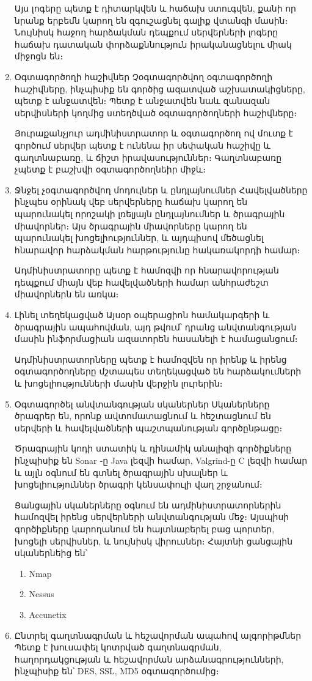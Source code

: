 \documentclass[11pt]{article}
\begin{document}
\begin{sloppypar}
\begin{enumerate}
    Այս լոգերը պետք է դիտարկվեն և հաճախ ստուգվեն, քանի որ նրանք երբեմն
    կարող են զգուշացնել գալիք վտանգի մասին։ Նույնիսկ հաջող հարձակման
    դեպքում սերվերների լոգերը հաճախ դատական փորձաքննություն
    իրականացնելու միակ միջոցն են։
\item Օգտագործողի հաշիվներ
    Չօգտագործվող օգտագործողի հաշիվները, ինչպիսիք են գործից ազատված
    աշխատակիցները, պետք է անջատվեն։ Պետք է անջատվեն նաև զանազան
    սերվիսների կողմից ստեղծված օգտագործողների հաշիվները։

    Յուրաքանչյուր ադմինիստրատոր և օգտագործող ով մուտք է գործում
    սերվեր պետք է ունենա իր սեփական հաշիվը և գաղտնաբառը, և ճիշտ
    իրավասություններ։ Գաղտնաբառը չպետք է բաշխվի օգտագործողնեիր միջև։
\item Ջնջել չօգտագործվող մոդուլներ և ընդլայնումներ
    Հավելվածները ինչպես օրինակ վեբ սերվերները հաճախ կարող են պարունակել
    որոշակի լռելյայն ընդլայնումներ և ծրագրային միավորներ։
    Այս ծրագրային միավորները կարող են պարունակել խոցելիություններ, և
    այդպիսով մեծացնել հնարավոր հարձակման հարթությունը հակառակորդի համար։

    Ադմինիստրատորը պետք է համոզվի որ հնարավորության դեպքում միայն
    վեբ հավելվածների համար անհրաժեշտ միավորներն են առկա։
\item Լինել տեղեկացված
    Այսօր օպերացիոն համակարգերի և ծրագրային ապահովման,
    այդ թվում՝ դրանց անվտանգության մասին ինֆորմացիան ազատորեն հասանելի է
    համացանցում։

    Ադմինիստրատորները պետք է համոզվեն որ իրենք և իրենց օգտագործողները
    մշտապես տեղեկացված են հարձակումների և խոցելիությունների մասին
    վերջին լուրերին։
\item Օգտագործել անվտանգության սկաներներ
    Սկաներները ծրագրեր են, որոնք ավտոմատացնում և հեշտացնում են սերվերի
    և հավելվածների պաշտպանության գործընթացը։

    Ծրագրային կոդի ստատիկ և դինամիկ անալիզի գործիքները ինչպիսիք են
    Sonar ֊ը Java լեզվի համար, Valgrind-ը C լեզվի համար և այլն
    օգնում են գտնել ծրագրային սխալներ և խոցելիություններ ծրագրի
    կենսափուլի վաղ շրջանում։

    Ցանցային սկաներները օգնում են ադմինիստրատորներին համոզվել իրենց
    սերվերների անվտանգության մեջ։ Այսպիսի գործիքները կարողանում են
    հայտնաբերել բաց պորտեր, խոցելի սերվիսներ, և նույնիսկ վիրուսներ։
    Հայտնի ցանցային սկաներնեից են՝
    \begin{enumerate}
        \item Nmap
        \item Nessus
        \item Accunetix
    \end{enumerate}
\item Ընտրել գաղտնագրման և հեշավորման ապահով ալգորիթմներ
    Պետք է խուսափել կոտրված գաղտնագրման, հաղորդակցության և
    հեշավորման արձանագրությունների, ինչպիսիք են՝ DES, SSL, MD5
    օգտագործումից։


\end{enumerate}
\end{sloppypar}
\end{document}
